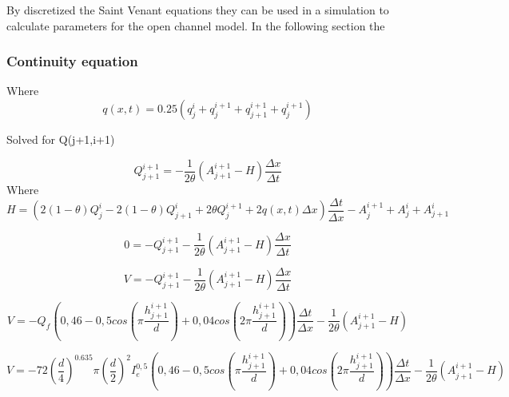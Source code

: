 By discretized the Saint Venant equations they can be used in a simulation to calculate parameters for the open channel model. In the following section the 

\subsubsection*{Continuity equation}

Where 
\begin{equation}
	q(x,t) = 0.25(q_j^i+q_j^{i+1}+q_{j+1}^{i+1}+q_j^{i+1})	
\end{equation}




Solved for Q(j+1,i+1)

\begin{equation}
	Q_{j+1}^{i+1} = - \frac{1}{2\theta}\left(A_{j+1}^{i+1}-H\right)\frac{\Delta x}{\Delta t}
\end{equation}
Where 
\begin{equation}
	H = \left(2(1-\theta)Q_j^i-2(1-\theta)Q_{j+1}^i+2\theta Q_j^{i+1}+2q(x,t)\Delta x\right)\frac{\Delta t}{\Delta x}- A_{j}^{i+1}+A_j^i+A_{j+1}^i
\end{equation}

\begin{equation}
		0=-Q_{j+1}^{i+1}  - \frac{1}{2\theta}\left(A_{j+1}^{i+1}-H\right)\frac{\Delta x}{\Delta t}
\end{equation}

\begin{equation}
		V=-Q_{j+1}^{i+1}  - \frac{1}{2\theta}\left(A_{j+1}^{i+1}-H\right)\frac{\Delta x}{\Delta t}
\end{equation}

\begin{equation}
	V = -Q_f\left(0,46-0,5cos\left(\pi \frac{h_{j+1}^{i+1}}{d}\right)+0,04cos\left(2\pi\frac{h_{j+1}^{i+1}}{d}\right)\right)\frac{\Delta t}{\Delta x}-\frac{1}{2\theta}\left(A_{j+1}^{i+1}-H\right)
\end{equation}

\begin{equation}
	V = -72\left(\frac{d}{4}\right)^{0.635}\pi\left(\frac{d}{2}\right)^2I_e^{0,5}\left(0,46-0,5cos\left(\pi \frac{h_{j+1}^{i+1}}{d}\right)+0,04cos\left(2\pi\frac{h_{j+1}^{i+1}}{d}\right)\right)\frac{\Delta t}{\Delta x}-\frac{1}{2\theta}\left(A_{j+1}^{i+1}-H\right)
\end{equation}

